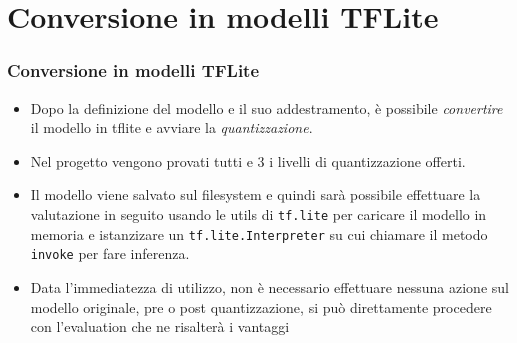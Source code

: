 \documentclass{beamer}
\begin{document}
\section{Conversione in modelli TFLite}
\begin{frame}
	\frametitle{Conversione in modelli TFLite}
	
	\begin{itemize}
		\item Dopo la definizione del modello e il suo addestramento, è possibile
		\textit{convertire} il modello in tflite e avviare la \textit{quantizzazione}.
	
		\item Nel progetto vengono provati tutti e 3 i livelli di quantizzazione offerti.
	
		\item Il modello viene salvato sul filesystem e quindi sarà possibile effettuare
		la valutazione in seguito usando le utils di \texttt{tf.lite} per caricare il modello
		in memoria e istanzizare un \texttt{tf.lite.Interpreter} su cui chiamare il metodo
		\texttt{invoke} per fare inferenza.
	
		\item Data l'immediatezza di utilizzo, non è necessario effettuare nessuna azione sul modello originale,
		pre o post quantizzazione, si può direttamente procedere con l'evaluation che ne risalterà i vantaggi
	\end{itemize}
	
\end{frame}
\end{document}
